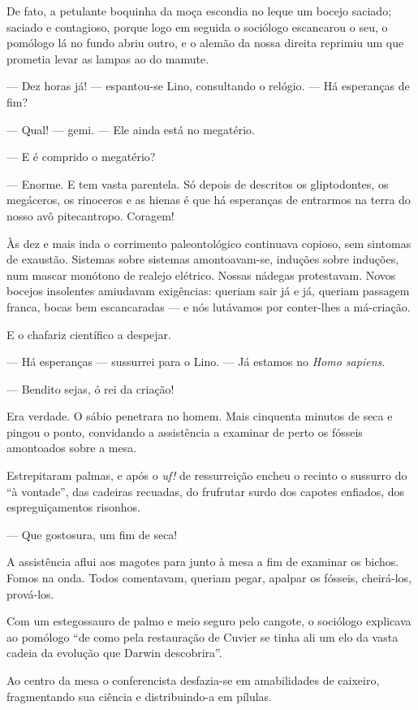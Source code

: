 De fato, a petulante boquinha da moça escondia no leque um bocejo
saciado; saciado e contagioso, porque logo em seguida o sociólogo
escancarou o seu, o pomólogo lá no fundo abriu outro, e o alemão da
nossa direita reprimiu um que prometia levar as lampas ao do mamute.

--- Dez horas já! --- espantou-se Lino, consultando o relógio. --- Há
esperanças de fim?

--- Qual! --- gemi. --- Ele ainda está no megatério.

--- E é comprido o megatério?

--- Enorme. E tem vasta parentela. Só depois de descritos os
gliptodontes, os megáceros, os rinoceros e as hienas é que há esperanças
de entrarmos na terra do nosso avô pitecantropo. Coragem!

Às dez e mais inda o corrimento paleontológico continuava copioso, sem
sintomas de exaustão. Sistemas sobre sistemas amontoavam-se, induções
sobre induções, num mascar monótono de realejo elétrico. Nossas nádegas
protestavam. Novos bocejos insolentes amiudavam exigências: queriam sair
já e já, queriam passagem franca, bocas bem escancaradas --- e nós
lutávamos por conter-lhes a má-criação.

E o chafariz científico a despejar.

--- Há esperanças --- sussurrei para o Lino. --- Já estamos no
\emph{Homo sapiens}.

--- Bendito sejas, ó rei da criação!

Era verdade. O sábio penetrara no homem. Mais cinquenta minutos de seca
e pingou o ponto, convidando a assistência a examinar de perto os
fósseis amontoados sobre a mesa.

Estrepitaram palmas, e após o \emph{uf!} de ressurreição encheu o
recinto o sussurro do ``à vontade'', das cadeiras recuadas, do frufrutar
surdo dos capotes enfiados, dos espreguiçamentos risonhos.

--- Que gostosura, um fim de seca!

A assistência aflui aos magotes para junto à mesa a fim de examinar os
bichos. Fomos na onda. Todos comentavam, queriam pegar, apalpar os
fósseis, cheirá-los, prová-los.

Com um estegossauro de palmo e meio seguro pelo cangote, o sociólogo
explicava ao pomólogo ``de como pela restauração de Cuvier se tinha ali
um elo da vasta cadeia da evolução que Darwin descobrira''.

Ao centro da mesa o conferencista desfazia-se em amabilidades de
caixeiro, fragmentando sua ciência e distribuindo-a em pílulas.

